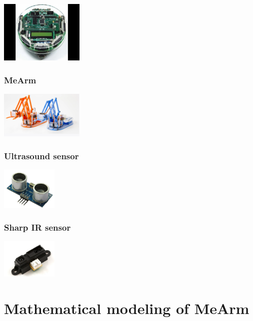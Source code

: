 \documentclass[12pt]{article}
\begin{document}
\begin{center}
\includegraphics[width=0.3\textwidth]{1.jpg}
\end{center}

\section{MeArm}

\begin{center}
\includegraphics[width=0.3\textwidth]{2.jpg}
\end{center}

\section{Ultrasound sensor}

\begin{center}
\includegraphics[width=0.2\textwidth]{3.jpg}
\end{center}

\section{Sharp IR sensor}

\begin{center}
\includegraphics[width=0.2\textwidth]{4.jpg}
\end{center}

\part{Mathematical modeling of MeArm}
\end{document}
